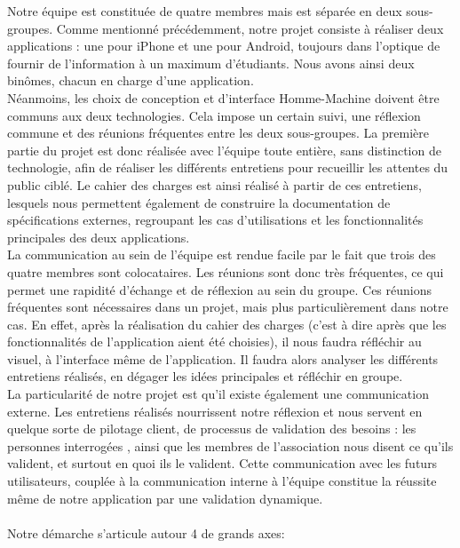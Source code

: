 \documentclass[a4paper,11px]{article}
\begin{document}

\indent Notre équipe est constituée de quatre membres mais est séparée en deux sous-groupes. Comme mentionné précédemment, notre projet consiste à réaliser deux applications : une pour iPhone et une pour Android, toujours dans l'optique de fournir de l'information à un maximum d'étudiants. Nous avons ainsi deux binômes, chacun en charge d'une application.\\
\indent Néanmoins, les choix de conception et d'interface Homme-Machine doivent être communs aux deux technologies. Cela impose un certain suivi, une réflexion commune et des réunions fréquentes entre les deux sous-groupes. La première partie du projet est donc réalisée avec l'équipe toute entière, sans distinction de technologie, afin de réaliser les différents entretiens pour recueillir les attentes du public ciblé. Le cahier des charges est ainsi réalisé à partir de ces entretiens, lesquels nous permettent également de construire la documentation de spécifications externes, regroupant les cas d'utilisations et les fonctionnalités principales des deux applications.\\
\indent La communication au sein de l'équipe est rendue facile par le fait que trois des quatre membres sont colocataires. Les réunions sont donc très fréquentes, ce qui permet une rapidité d'échange et de réflexion au sein du groupe. Ces réunions fréquentes sont nécessaires dans un projet, mais plus particulièrement dans notre cas. En effet, après la réalisation du cahier des charges (c'est à dire après que les fonctionnalités de l'application aient été choisies), il nous faudra réfléchir au visuel, à l'interface même de l'application. Il faudra alors analyser les différents entretiens réalisés, en dégager les idées principales et réfléchir en groupe.\\
\indent La particularité de notre projet est qu'il existe également une communication externe. Les entretiens réalisés nourrissent notre réflexion et nous servent en quelque sorte de pilotage client, de processus de validation des besoins : les personnes interrogées , ainsi que les membres de l'association nous disent ce qu'ils valident, et surtout en quoi ils le valident. Cette communication avec les futurs utilisateurs, couplée à la communication interne à l'équipe constitue la réussite même de notre application par une validation dynamique.\\
\\
\indent Notre démarche s'articule autour 4 de grands axes:
\end{document}

